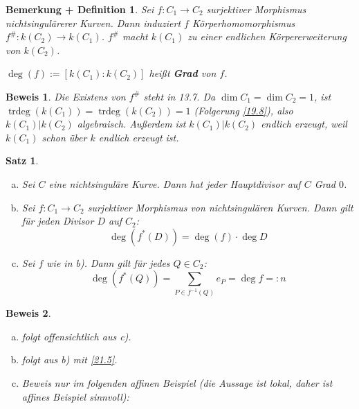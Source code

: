 \documentclass[a4paper, 12pt, numbers=noendperiod, chapterprefix=true, headsepline]{scrbook}
\theoremstyle{break}
\newtheorem{Satz}{Satz}
\newtheorem{BemDef}[Def]{Bemerkung + Definition}
\theoremstyle{nonumberbreak}
\newtheorem{Bew}{Beweis}
\theoremstyle{nonumberplain}
\newcommand{\emp}[1]{\textbf{\emph{#1}}}
\newcommand{\defterm}[1]{{\index{#1}}\emp{#1}}
\DeclareMathOperator{\trdeg}{trdeg}
\begin{document}
\begin{BemDef}
Sei $f:C_1\to C_2$ surjektiver Morphismus nichtsingul\"arerer Kurven. Dann induziert $f$ K\"orperhomomorphismus $f^\#: k(C_2) \to k(C_1)$. $f^\#$ macht $k(C_1)$ zu einer endlichen K\"orpererweiterung von $k(C_2)$.

$\deg(f) := [k(C_1) : k(C_2)]$ hei\ss t \defterm{Grad} von $f$.
\end{BemDef}

\begin{Bew}
Die Existens von $f^\#$ steht in 13.7. Da $\dim C_1 = \dim C_2 = 1$, ist $\trdeg(k(C_1)) = \trdeg(k(C_2)) = 1$ (Folgerung \ref{19.8}), also $k(C_1)|k(C_2)$ algebraisch. Au\ss erdem ist $k(C_1)|k(C_2)$ endlich erzeugt, weil $k(C_1)$ schon \"uber $k$ endlich erzeugt ist.
\end{Bew}

\begin{Satz}\begin{enumerate}[a)]
\item
	Sei $C$ eine nichtsingul\"are Kurve. Dann hat jeder Hauptdivisor auf $C$ Grad $0$.
\item
	Sei $f: C_1 \to C_2$ surjektiver Morphismus von nichtsingul\"aren Kurven. Dann gilt f\"ur jeden Divisor $D$ auf $C_2$:
		\[ \deg(f^*(D)) = \deg(f) \cdot \deg D \]
\item
	Sei $f$ wie in b). Dann gilt f\"ur jedes $Q\in C_2$:
		\[ \deg(f^*(Q)) = \sum_{P\in f^{-1}(Q)} e_P = \deg f =: n \]
\end{enumerate}\end{Satz}

\begin{Bew}\begin{enumerate}[a)]
\item[b)]
	folgt offensichtlich aus c).
\item[a)]
	folgt aus b) mit \ref{21.5}.
\item[c)]
	Beweis nur im folgenden affinen Beispiel (die Aussage ist lokal, daher ist affines Beispiel sinnvoll):
\end{enumerate}\end{Bew}
\end{document}
